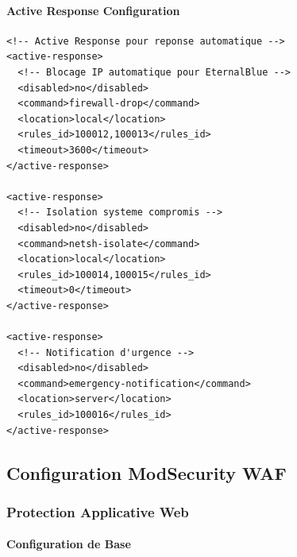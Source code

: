 \paragraph{Active Response Configuration}

\begin{lstlisting}[style=xmlstyle,caption=Active Response pour isolation automatique]
<!-- Active Response pour reponse automatique -->
<active-response>
  <!-- Blocage IP automatique pour EternalBlue -->
  <disabled>no</disabled>
  <command>firewall-drop</command>
  <location>local</location>
  <rules_id>100012,100013</rules_id>
  <timeout>3600</timeout>
</active-response>

<active-response>
  <!-- Isolation systeme compromis -->
  <disabled>no</disabled>
  <command>netsh-isolate</command>
  <location>local</location>
  <rules_id>100014,100015</rules_id>
  <timeout>0</timeout>
</active-response>

<active-response>
  <!-- Notification d'urgence -->
  <disabled>no</disabled>
  <command>emergency-notification</command>
  <location>server</location>
  <rules_id>100016</rules_id>
</active-response>
\end{lstlisting}

\subsection{Configuration ModSecurity WAF}

\subsubsection{Protection Applicative Web}

\paragraph{Configuration de Base}

